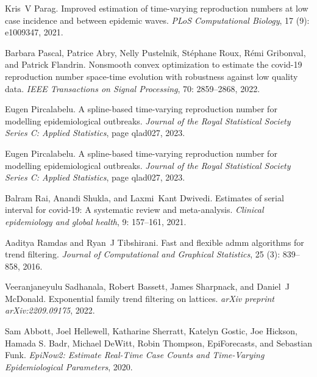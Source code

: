 \documentclass[10pt,letterpaper]{article}
\begin{document}
\begin{thebibliography}{32}
  Kris~V Parag.
  \newblock Improved estimation of time-varying reproduction numbers at low case
    incidence and between epidemic waves.
  \newblock \emph{PLoS Computational Biology}, 17 (9):
    e1009347, 2021.
  
  Barbara Pascal, Patrice Abry, Nelly Pustelnik, St{\'e}phane Roux, R{\'e}mi
    Gribonval, and Patrick Flandrin.
  \newblock Nonsmooth convex optimization to estimate the covid-19 reproduction
    number space-time evolution with robustness against low quality data.
  \newblock \emph{IEEE Transactions on Signal Processing}, 70:
    2859--2868, 2022.
  
  Eugen Pircalabelu.
  \newblock A spline-based time-varying reproduction number for modelling
    epidemiological outbreaks.
  \newblock \emph{Journal of the Royal Statistical Society Series C: Applied
    Statistics}, page qlad027, 2023{}.
  
  Eugen Pircalabelu.
  \newblock A spline-based time-varying reproduction number for modelling
    epidemiological outbreaks.
  \newblock \emph{Journal of the Royal Statistical Society Series C: Applied
    Statistics}, page qlad027, 2023{}.
  
  Balram Rai, Anandi Shukla, and Laxmi~Kant Dwivedi.
  \newblock Estimates of serial interval for covid-19: A systematic review and
    meta-analysis.
  \newblock \emph{Clinical epidemiology and global health}, 9: 157--161,
    2021.
  
  Aaditya Ramdas and Ryan~J Tibshirani.
  \newblock Fast and flexible admm algorithms for trend filtering.
  \newblock \emph{Journal of Computational and Graphical Statistics}, 25
    (3): 839--858, 2016.
  
  Veeranjaneyulu Sadhanala, Robert Bassett, James Sharpnack, and Daniel~J
    McDonald.
  \newblock Exponential family trend filtering on lattices.
  \newblock \emph{arXiv preprint arXiv:2209.09175}, 2022.
  
  {Sam Abbott}, {Joel Hellewell}, {Katharine Sherratt}, {Katelyn Gostic}, {Joe
    Hickson}, {Hamada S. Badr}, {Michael DeWitt}, {Robin Thompson},
    {EpiForecasts}, and {Sebastian Funk}.
  \newblock \emph{EpiNow2: Estimate Real-Time Case Counts and Time-Varying
    Epidemiological Parameters}, 2020.
  

\end{thebibliography}
\end{document}
